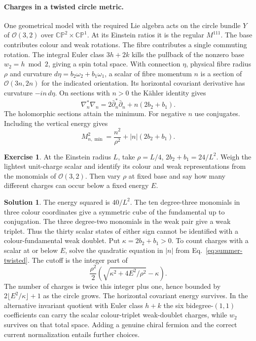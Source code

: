 \documentclass[10pt]{article}
\theoremstyle{definition}
\newtheorem{exercise}{Exercise}
\newtheorem{solution}{Solution}
\begin{document}
\paragraph{Charges in a twisted circle metric.}
One geometrical model with the required Lie algebra acts on the circle bundle \(Y\) of \(\mathcal O(3,2)\) over \(\mathbb{CP}^2\times\mathbb{CP}^1\). At its Einstein ratios it is the regular \(M^{111}\). The base contributes colour and weak rotations. The fibre contributes a single commuting rotation. The integral Euler class \(3h+2k\) kills the pullback of the nonzero base \(w_2=h\bmod2\), giving a spin total space. With connection \(\eta\), physical fibre radius \(\rho\) and curvature \(d\eta=b_2\omega_2+b_1\omega_1\), a scalar of fibre momentum \(n\) is a section of \(\mathcal O(3n,2n)\) for the indicated orientation. Its horizontal covariant derivative has curvature \(-in\,d\eta\). On sections with \(n>0\) the K\"ahler identity gives
\begin{equation}
 \nabla_n^*\nabla_n
       =2\bar\partial_n^*\bar\partial_n+n(2b_2+b_1).
\end{equation}
The holomorphic sections attain the minimum. For negative \(n\) use conjugates. Including the vertical energy gives
\begin{equation}
 M_{n,\min}^2=\frac{n^2}{\rho^2}+|n|(2b_2+b_1).
 \label{eq:summer-twisted}
\end{equation}

\begin{exercise}
At the Einstein radius \(L\), take \(\rho=L/4\), \(2b_2+b_1=24/L^2\). Weigh the lightest unit-charge scalar and identify its colour and weak representations from the monomials of \(\mathcal O(3,2)\). Then vary \(\rho\) at fixed base and say how many different charges can occur below a fixed energy \(E\).
\end{exercise}

\begin{solution}
The energy squared is \(40/L^2\). The ten degree-three monomials in three colour coordinates give a symmetric cube of the fundamental up to conjugation. The three degree-two monomials in the weak pair give a weak triplet. Thus the thirty scalar states of either sign cannot be identified with a colour-fundamental weak doublet. Put \(\kappa=2b_2+b_1>0\). To count charges with a scalar at or below \(E\), solve the quadratic equation in \(|n|\) from Eq.~\eqref{eq:summer-twisted}. The cutoff is the integer part of
\begin{equation}
 \frac{\rho^2}{2}\left(\sqrt{\kappa^2+4E^2/\rho^2}-\kappa\right).
\end{equation}
The number of charges is twice this integer plus one, hence bounded by \(2\lfloor E^2/\kappa\rfloor+1\) as the circle grows. The horizontal covariant energy survives. In the alternative invariant quotient with Euler class \(h+k\) the six bidegree-\((1,1)\) coefficients can carry the scalar colour-triplet weak-doublet charges, while \(w_2\) survives on that total space. Adding a genuine chiral fermion and the correct current normalization entails further choices.
\end{solution}
\end{document}
